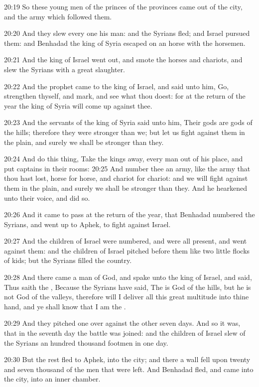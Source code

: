 20:19 So these young men of the princes of the provinces came out of
the city, and the army which followed them.

20:20 And they slew every one his man: and the Syrians fled; and
Israel pursued them: and Benhadad the king of Syria escaped on an
horse with the horsemen.

20:21 And the king of Israel went out, and smote the horses and
chariots, and slew the Syrians with a great slaughter.

20:22 And the prophet came to the king of Israel, and said unto him,
Go, strengthen thyself, and mark, and see what thou doest: for at the
return of the year the king of Syria will come up against thee.

20:23 And the servants of the king of Syria said unto him, Their gods
are gods of the hills; therefore they were stronger than we; but let
us fight against them in the plain, and surely we shall be stronger
than they.

20:24 And do this thing, Take the kings away, every man out of his
place, and put captains in their rooms: 20:25 And number thee an army,
like the army that thou hast lost, horse for horse, and chariot for
chariot: and we will fight against them in the plain, and surely we
shall be stronger than they. And he hearkened unto their voice, and
did so.

20:26 And it came to pass at the return of the year, that Benhadad
numbered the Syrians, and went up to Aphek, to fight against Israel.

20:27 And the children of Israel were numbered, and were all present,
and went against them: and the children of Israel pitched before them
like two little flocks of kids; but the Syrians filled the country.

20:28 And there came a man of God, and spake unto the king of Israel,
and said, Thus saith the \LORD, Because the Syrians have said, The \LORD
is God of the hills, but he is not God of the valleys, therefore will
I deliver all this great multitude into thine hand, and ye shall know
that I am the \LORD.

20:29 And they pitched one over against the other seven days. And so
it was, that in the seventh day the battle was joined: and the
children of Israel slew of the Syrians an hundred thousand footmen in
one day.

20:30 But the rest fled to Aphek, into the city; and there a wall fell
upon twenty and seven thousand of the men that were left. And Benhadad
fled, and came into the city, into an inner chamber.

